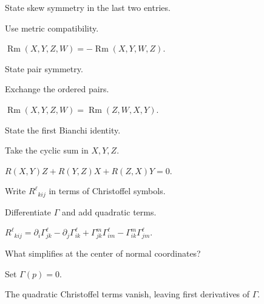 \begin{exercise}\label{exr:vii26-06}
State skew symmetry in the last two entries.
\end{exercise}
\begin{hint}
Use metric compatibility.
\end{hint}
\begin{solution}
\(\operatorname{Rm}(X,Y,Z,W)=-\operatorname{Rm}(X,Y,W,Z)\).
\end{solution}

\begin{exercise}\label{exr:vii26-07}
State pair symmetry.
\end{exercise}
\begin{hint}
Exchange the ordered pairs.
\end{hint}
\begin{solution}
\(\operatorname{Rm}(X,Y,Z,W)=\operatorname{Rm}(Z,W,X,Y)\).
\end{solution}

\begin{exercise}\label{exr:vii26-08}
State the first Bianchi identity.
\end{exercise}
\begin{hint}
Take the cyclic sum in \(X,Y,Z\).
\end{hint}
\begin{solution}
\(R(X,Y)Z+R(Y,Z)X+R(Z,X)Y=0\).
\end{solution}

\begin{exercise}\label{exr:vii26-09}
Write \(R^\ell{}_{kij}\) in terms of Christoffel symbols.
\end{exercise}
\begin{hint}
Differentiate \(\Gamma\) and add quadratic terms.
\end{hint}
\begin{solution}
\(R^\ell{}_{kij}=\partial_i\Gamma^\ell_{jk}-\partial_j\Gamma^\ell_{ik}+\Gamma^m_{jk}\Gamma^\ell_{im}-\Gamma^m_{ik}\Gamma^\ell_{jm}\).
\end{solution}

\begin{exercise}\label{exr:vii26-10}
What simplifies at the center of normal coordinates?
\end{exercise}
\begin{hint}
Set \(\Gamma(p)=0\).
\end{hint}
\begin{solution}
The quadratic Christoffel terms vanish, leaving first derivatives of \(\Gamma\).
\end{solution}

